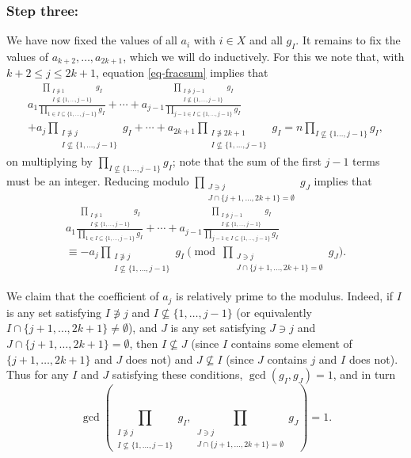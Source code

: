 \documentclass[11pt,letterpaper]{amsart}
\newcommand{\brac}[1]{\left( #1\right)}
\newcommand{\ogcd}[2]{\gcd(#1,#2)}
\newcommand{\bracgcd}[2]{\gcd\brac{#1,#2}}
\theoremstyle{definition}
\begin{document}
\subsubsection{Step three:}
We have now fixed the values of all $a_i$ with $i \in X$ and all $g_I$. It remains to fix the values of $a_{k+2}, \dots, a_{2k+1}$, which we will do inductively. For this we note that, with $k+2 \le j \le 2k+1$, equation \eqref{eq-fracsum} implies that
\begin{multline*}
    a_1 \frac{\prod_{\substack{I \not\ni 1 \\ I \not\subseteq \{1, \dots, j-1\}}} g_I }{\prod_{1 \in I \subseteq \{1, \dots, j-1\}}g_I} + \cdots + a_{j-1} \frac{\prod_{\substack{I \not\ni j-1 \\ I \not\subseteq \{1, \dots, j-1\}}}g_I}{\prod_{j-1 \in I \subseteq \{1, \dots, j-1\}}g_I} \\
    + a_j \prod_{\substack{I \not\ni j \\ I \not\subseteq \{1, \dots, j-1\}}} g_I + \cdots + a_{2k+1} \prod_{\substack{I \not\ni 2k+1 \\ I \not \subseteq \{1, \dots, j-1\}}} g_I = n \prod_{I \not\subseteq\{1 \dots, j-1\}} g_I,
\end{multline*}
on multiplying by $\prod_{I \not\subseteq\{1 \dots, j-1\}} g_I$; note that the sum of the first $j-1$ terms must be an integer.
Reducing modulo $\prod_{\substack{J \ni j \\ J \cap \{j+1, \dots, 2k+1\} = \emptyset}} g_J$ implies that
\begin{multline*}
    a_1 \frac{\prod_{\substack{I \not\ni 1 \\ I \not\subseteq \{1, \dots, j-1\}}} g_I }{\prod_{1 \in I \subseteq \{1, \dots, j-1\}} g_I } + \cdots + a_{j-1} \frac{\prod_{\substack{I \not\ni j-1 \\ I \not\subseteq \{1, \dots, j-1\}}} g_I }{\prod_{j-1 \in I \subseteq \{1, \dots, j-1\}} g_I } \\
    \equiv -a_j \prod_{\substack{I \not\ni j \\ I \not\subseteq \{1, \dots, j-1\}}} g_I \pmod{\prod_{\substack{J \ni j\\ J\cap \{j+1,\ldots,2k+1\}= \emptyset}}g_J}.
\end{multline*}

We claim that the coefficient of $a_j$ is relatively prime to the modulus. Indeed, if $I$ is any set satisfying $I \not\ni j$ and $I \not\subseteq \{1, \dots, j-1\}$ (or equivalently $I \cap \{j+1, \dots, 2k+1\} \neq \emptyset$), and $J$ is any set satisfying $J \ni j$ and $J \cap \{j+1, \dots, 2k+1\} = \emptyset$, then $I \not\subseteq J$ (since $I$ contains some element of $\{j+1, \dots, 2k+1\}$ and $J$ does not) and $J \not\subseteq I$ (since $J$ contains $j$ and $I$ does not). Thus for any $I$ and $J$ satisfying these conditions, $\ogcd{g_I}{g_J} = 1$, and in turn
\begin{equation*}
    \bracgcd{\prod_{\substack{I \not\ni j \\ I \not\subseteq \{1, \dots, j-1\}}} g_I}{\prod_{\substack{J \ni j\\ J\cap \{j+1,\ldots,2k+1\}= \emptyset}}g_J} = 1.
\end{equation*}
\end{document}
